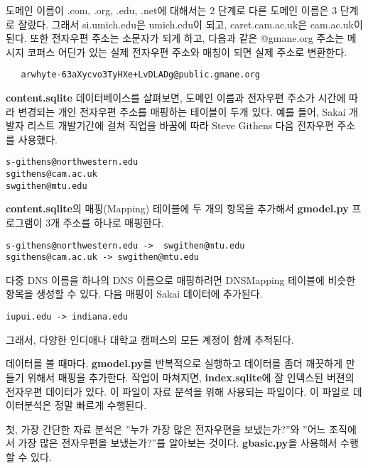 도메인 이름이  .com, .org, .edu, .net에 대해서는 2 단계로 다른 도메인 이름은 3 단계로 잘랐다.
그래서 si.umich.edu은 umich.edu이 되고, caret.cam.ac.uk은 cam.ac.uk이 된다.
또한 전자우편 주소는 소문자가 되게 하고, 다음과 같은  @gmane.org 주소는 
메시지 코퍼스 어딘가 있는 실제 전자우편 주소와 매칭이 되면 실제 주소로 변환한다.

\beforeverb
\begin{verbatim}
   arwhyte-63aXycvo3TyHXe+LvDLADg@public.gmane.org
\end{verbatim}
\afterverb
%

{\bf content.sqlite} 데이터베이스를 살펴보면, 도메인 이름과 
전자우편 주소가 시간에 따라 변경되는 개인 전자우편 주소를 매핑하는 테이블이 두개 있다.
예를 들어, Sakai 개발자 리스트 개발기간에 걸쳐 직업을 바꿈에 따라 Steve Githens 다음 전자우편 주소를 사용했다.

\beforeverb
\begin{verbatim}
s-githens@northwestern.edu
sgithens@cam.ac.uk
swgithen@mtu.edu
\end{verbatim}
\afterverb
%

{\bf content.sqlite}의 매핑(Mapping) 테이블에 두 개의 항목을 추가해서 
{\bf gmodel.py} 프로그램이 3개 주소를 하나로 매핑한다.

\beforeverb
\begin{verbatim}
s-githens@northwestern.edu ->  swgithen@mtu.edu
sgithens@cam.ac.uk -> swgithen@mtu.edu
\end{verbatim}
\afterverb
%

다중 DNS 이름을 하나의 DNS 이름으로 매핑하려면 DNSMapping 테이블에 비슷한 항목을 생성할 수 있다.
다음 매핑이 Sakai 데이터에 추가된다.

\beforeverb
\begin{verbatim}
iupui.edu -> indiana.edu
\end{verbatim}
\afterverb
%

그래서, 다양한 인디애나 대학교 캠퍼스의 모든 계정이 함께 추적된다.

데이터를 볼 때마다, {\bf gmodel.py}를 반복적으로 실행하고 데이터를 좀더 깨끗하게 만들기 위해서 매핑을 추가한다. 작업이 마쳐지면, {\bf index.sqlite}에 잘 인덱스된 버젼의 전자우편 데이터가 있다.
이 파일이 자료 분석을 위해 사용되는 파일이다. 이 파일로 데이터분석은 정말 빠르게 수행된다.

첫, 가장 간단한 자료 분석은 ''누가 가장 많은 전자우편을 보냈는가?''와 ''어느 조직에서 가장 많은 전자우편을 보냈는가?''를 알아보는 것이다. {\bf gbasic.py}을 사용해서 수행할 수 있다.

